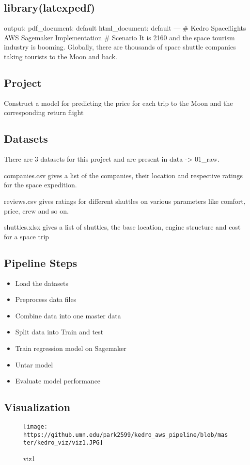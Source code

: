 \documentclass[
]{article}
\author{}
\date{\vspace{-2.5em}}
\providecommand{\tightlist}{%
  \setlength{\itemsep}{0pt}\setlength{\parskip}{0pt}}
\begin{document}
\hypertarget{librarylatexpedf}{%
\subsection{library(latexpedf)}\label{librarylatexpedf}}

output: pdf\_document: default html\_document: default --- \# Kedro
Spaceflights AWS Sagemaker Implementation \# Scenario It is 2160 and the
space tourism industry is booming. Globally, there are thousands of
space shuttle companies taking tourists to the Moon and back.

\hypertarget{project}{%
\subsection{Project}\label{project}}

Construct a model for predicting the price for each trip to the Moon and
the corresponding return flight

\hypertarget{datasets}{%
\subsection{Datasets}\label{datasets}}

There are 3 datasets for this project and are present in data
-\textgreater{} 01\_raw.

companies.csv gives a list of the companies, their location and
respective ratings for the space expedition.

reviews.csv gives ratings for different shuttles on various parameters
like comfort, price, crew and so on.

shuttles.xlsx gives a list of shuttles, the base location, engine
structure and cost for a space trip

\hypertarget{pipeline-steps}{%
\subsection{Pipeline Steps}\label{pipeline-steps}}

\begin{itemize}
\tightlist
\item
  Load the datasets
\item
  Preprocess data files
\item
  Combine data into one master data
\item
  Split data into Train and test
\item
  Train regression model on Sagemaker
\item
  Untar model
\item
  Evaluate model performance
\end{itemize}

\hypertarget{visualization}{%
\subsection{Visualization}\label{visualization}}

\begin{figure}
\centering
\texttt{[image: https://github.umn.edu/park2599/kedro\_aws\_pipeline/blob/master/kedro\_viz/viz1.JPG]}
\caption{viz1}
\end{figure}
\end{document}
